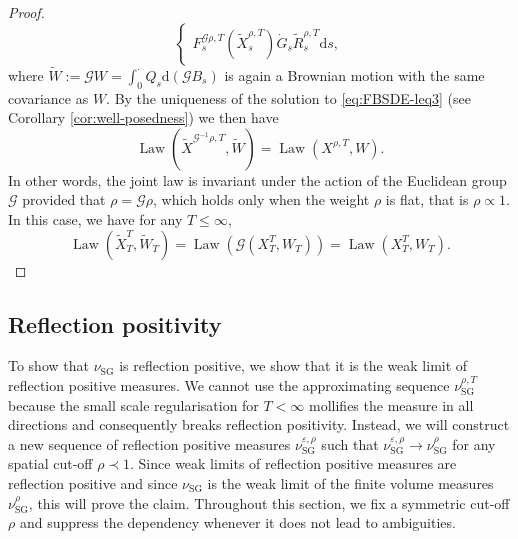 \documentclass[11pt, a4paper]{scrartcl}
\numberwithin{equation}{section}
\theoremstyle{plain}
\theoremstyle{remark}
\newcommand{\assign}{:=}
\newcommand{\mathd}{\mathrm{d}}
\newcommand{\tmop}[1]{\ensuremath{\operatorname{#1}}}
\begin{document}
\begin{proof}
\[\begin{cases}
			F^{\mathcal{G} \rho, T}_s (\tilde{X}_s^{\rho, T})  \dot{G}_s
			\tilde{R}_s^{\rho, T} \mathd s,
		\end{cases} \]
	where $\tilde{W} \assign \mathcal{G} W = \int_0^{\cdot} Q_s \mathd
		(\mathcal{G} B_s)$ is again a Brownian motion with the same covariance as
	$W$. By the uniqueness of the solution to \eqref{eq:FBSDE-leq3} (see
	Corollary \ref{cor:well-posedness}) we then have
	\[ \tmop{Law} (\tilde{X}^{\mathcal{G}^{- 1} \rho, T}, \tilde{W}) =
		\tmop{Law} (X^{\rho, T}, W) . \]
	In other words, the joint law is invariant under the action of the Euclidean
	group $\mathcal{G}$ provided that $\rho = \mathcal{G} \rho$, which holds
	only when the weight $\rho$ is flat, that is $\rho \propto 1$. In this case,
	we have for any $T \leqslant \infty$,
	\[ \tmop{Law} (\tilde{X}^T_T, \tilde{W}_T) = \tmop{Law} (\mathcal{G} (X^T_T,
		W_T)) = \tmop{Law} (X^T_T, W_T) . \]
\end{proof}

\subsection{Reflection positivity}\label{sec:RP}

To show that $\nu_{\tmop{SG}}$ is reflection positive, we show that it is the
weak limit of reflection positive measures. We cannot use the approximating
sequence $\nu^{\rho, T}_{\tmop{SG}}$because the small scale regularisation for
$T < \infty$ mollifies the measure in all directions and consequently breaks
reflection positivity. Instead, we will construct a new sequence of reflection
positive measures $\nu_{\tmop{SG}}^{\varepsilon, \rho}$ such that
$\nu_{\tmop{SG}}^{\varepsilon, \rho} \rightarrow \nu_{\tmop{SG}}^{\rho}$ for
any spatial cut-off $\rho \prec 1$. Since weak limits of reflection positive
measures are reflection positive and since $\nu_{\tmop{SG}}$ is the weak limit
of the finite volume measures $\nu_{\tmop{SG}}^{\rho}$, this will prove the
claim. Throughout this section, we fix a symmetric cut-off $\rho$ and suppress
the dependency whenever it does not lead to ambiguities.
\end{document}
